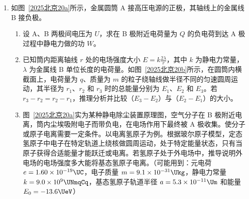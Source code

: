 \documentclass[\gkver]{gaokaozhenti}
\begin{document}
\begin{enumerate}
{（2）加速过程，设起飞速度为 $v_{m}$，根据速度位移关系 $v_{m}^{2} = 2a_{1}d$

减速过程，根据速度位移关系 $v_{m}^{2} = 2a_{2}(L - d)$

联立解得 $d = \frac{a_{2}L}{a_{1} + a_{2}}$

（3）在无风的情况下，飞机以速率 $u$ 水平飞行时，相对飞机的气流速率也为 $u$，并且气流掠过机翼改变方向，从而对机翼产生升力。根据升力公式，升力与气流的动量变化有关，根据动量定理 $F\Delta t = \Delta p$

又 $\Delta p = m\Delta v$，$m = \rho S\Delta v \cdot \Delta t$

代入可得 $F = \rho S\Delta v^{2}$

又 $\Delta v \propto u$，可知 $F \propto u^{2}$

即 $\alpha = 2$
}

\item
如图~\ref{2025北京20a}所示，金属圆筒 A 接高压电源的正极，其轴线上的金属线 B 接负极。
\begin{enumerate}
	\item
	设 A、B 两极间电压为 $U$，求在 B 极附近电荷量为 $Q$ 的负电荷到达 A 极过程中静电力做的功 $W$。
	\item
	已知筒内距离轴线 $r$ 处的电场强度大小 $E = k\frac{2\lambda}{r}$，其中 $k$ 为静电力常量，$\lambda$ 为金属线 B 单位长度的电荷量。如图~\ref{2025北京20b}所示，在圆筒内横截面上，电荷量为 $q$、质量为 $m$ 的粒子绕轴线做半径不同的匀速圆周运动，其半径为 $r_{1}$、$r_{2}$ 和 $r_{3}$ 时的总能量分别为 $E_{1}$、$E_{2}$ 和 $E_{3}$。若 $r_{3} - r_{2} = r_{2} - r_{1}$，推理分析并比较（$E_{3} - E_{2}$）与（$E_{2} - E_{1}$）的大小。
	\item
	图~\ref{2025北京20a}实为某种静电除尘装置原理图，空气分子在 B 极附近电离，筒内尘埃吸附电子而带负电，在电场作用下最终被 A 极收集。使分子或原子电离需要一定条件。以电离氢原子为例。根据玻尔原子模型，定态氢原子中电子在特定轨道上绕核做圆周运动，处于特定能量状态，只有当原子获得合适能量才能跃迁或电离。若氢原子处于外电场中，推导说明外电场的电场强度多大能将基态氢原子电离。（可能用到：元电荷 $e = 1.60 \times 10^{-19} \UC$，电子质量 $m = 9.1 \times 10^{-31} \Ukg$，静电力常量 $k = 9.0 \times 10^{9} \UNmqCq$，基态氢原子轨道半径 $a = 5.3 \times 10^{-11} \Um$ 和能量 $E_{0} = -13.6 \UeV$）
\end{enumerate}



\end{enumerate}
\end{document}
